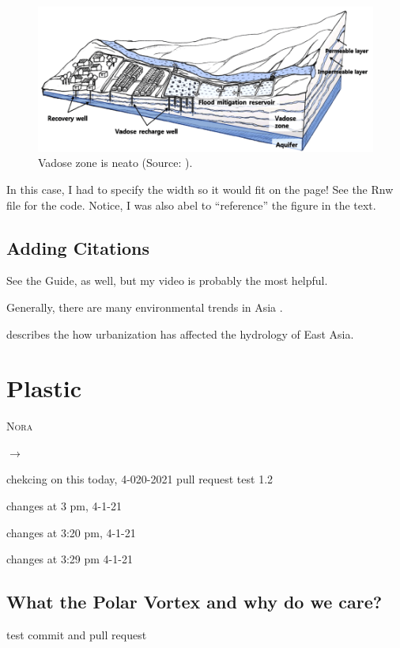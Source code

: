 \documentclass{book}\usepackage{knitr}
\makeatletter
\newcommand{\chapterauthor}[1]{%
  {\parindent0pt\vspace*{-25pt}%
  \linespread{1.1}\large\scshape#1%
  \par\nobreak\vspace*{35pt}}
  \@afterheading%
}
\makeatother
\begin{document}
\begin{figure}
\includegraphics[width=\linewidth]{images/Lee-Vadose}
\caption{Vadose zone is neato (Source: \citet{lee2017fifty}).}
\label{fig:vadose}
\end{figure}

In this case, I had to specify the width so it would fit on the page!  See the Rnw file for the code. Notice, I was also abel to ``reference'' the figure in the text.

\section{Adding Citations}

See the Guide, as well, but my video is probably the most helpful.


Generally, there are many environmental trends in Asia \citep{imura2005urban}.

\citet{imura2005urban} describes the how urbanization has affected the hydrology of East Asia. 
 

\chapter{Plastic}

\chapterauthor{Nora}

$\rightarrow$

chekcing on this today, 4-020-2021
pull request test 1.2 

changes at 3 pm, 4-1-21

changes at 3:20 pm, 4-1-21

changes at 3:29 pm 4-1-21



\section{What the Polar Vortex and why do we care?}

test commit and pull request 
\end{document}
